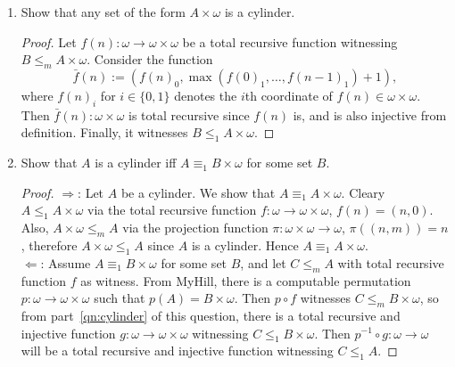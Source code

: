\documentclass{article}
\begin{document}
\begin{enumerate}[label={\bf Q\arabic*:}]
\begin{enumerate}[label={\bf (\roman*)}]
      \item Show that any set of the form $A\times\omega$ is a cylinder.
        \begin{proof}
          Let $f(n):\omega\rightarrow\omega\times\omega$ be a total
          recursive function witnessing $B\leq_m A\times\omega$. Consider
          the function
          \[\bar{f}(n):= (f(n)_0,\max(f(0)_1,\ldots,f(n-1)_1)+1),\]
          where $f(n)_i$ for $i\in\{0,1\}$ denotes the $i$th coordinate of
          $f(n)\in\omega\times\omega$. Then $\bar{f}(n):\omega\times\omega$
          is total recursive since $f(n)$ is, and is also injective from
          definition. Finally, it witnesses $B\leq_1A\times\omega$.
        \end{proof}
        \label{qn:cylinder}

      \item Show that $A$ is a cylinder iff $A\equiv_1B\times\omega$ for
        some set $B$.
        \begin{proof}
          $\Rightarrow$: Let $A$ be a cylinder. We show that
          $A\equiv_1A\times\omega$. Cleary $A\leq_1A\times\omega$ via the
          total recursive function $f:\omega\rightarrow\omega\times\omega$,
          $f(n)=(n,0)$. Also, $A\times\omega\leq_m A$ via the projection
          function $\pi:\omega\times\omega\rightarrow\omega$,
          $\pi((n,m))=n$, therefore $A\times\omega\leq_1A$ since $A$ is a
          cylinder. Hence $A\equiv_1A\times\omega$. \\

          $\Leftarrow$: Assume $A\equiv_1B\times\omega$ for some set $B$,
          and let $C\leq_m A$ with total recursive function $f$ as witness.
          From MyHill, there is a computable permutation
          $p:\omega\rightarrow\omega\times\omega$ such that
          $p(A)=B\times\omega$. Then $p\circ f$ witnesses $C\leq_m
          B\times\omega$, so from part~\ref{qn:cylinder} of this question,
          there is a total recursive and injective function
          $g:\omega\rightarrow\omega\times\omega$ witnessing
          $C\leq_1B\times\omega$. Then $p^{-1}\circ
          g:\omega\rightarrow\omega$ will be a total recursive and
          injective function witnessing $C\leq_1A$.
        \end{proof}
    \end{enumerate}
\end{enumerate}
\end{document}
